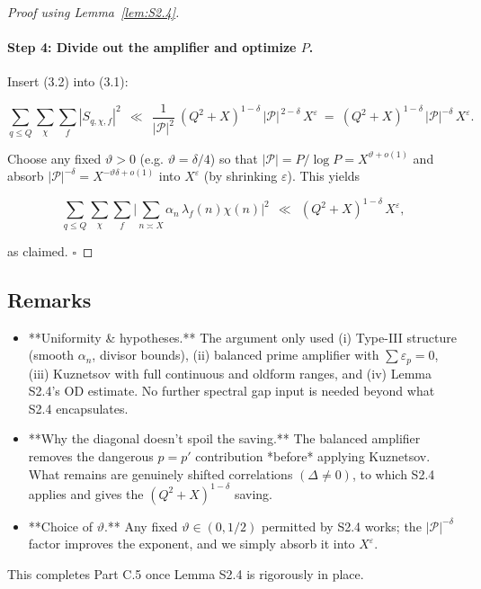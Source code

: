 \documentclass[11pt]{article}
\theoremstyle{definition}
\theoremstyle{remark}
\begin{document}
\begin{proof}[Proof using Lemma~\ref{lem:S2.4}]
\paragraph{Step 4: Divide out the amplifier and optimize $P$.}
Insert (3.2) into (3.1):

$$
\sum_{q\le Q}\sum_{\chi}\sum_f |S_{q,\chi,f}|^2
\ \ \ll\ \ \frac{1}{|\mathcal P|^2}\ (Q^2+X)^{1-\delta}\,|\mathcal P|^{\,2-\delta}\,X^{\varepsilon}
\ =\ (Q^2+X)^{1-\delta}\,|\mathcal P|^{-\delta}\,X^{\varepsilon}.
$$

Choose any fixed $\vartheta>0$ (e.g. $\vartheta=\delta/4$) so that $|\mathcal P|=P/\log P=X^{\vartheta+o(1)}$ and absorb $|\mathcal P|^{-\delta}=X^{-\vartheta\delta+o(1)}$ into $X^{\varepsilon}$ (by shrinking $\varepsilon$). This yields

$$
\sum_{q\le Q}\sum_{\chi}\sum_f \Big|\sum_{n\asymp X}\alpha_n\,\lambda_f(n)\chi(n)\Big|^2
\ \ \ll\ \ (Q^2+X)^{1-\delta}\,X^{\varepsilon},
$$

as claimed. $\square$

\end{proof}

\subsection*{Remarks}

\begin{itemize}
\item **Uniformity \& hypotheses.** The argument only used (i) Type-III structure (smooth $\alpha_n$, divisor bounds), (ii) balanced prime amplifier with $\sum \varepsilon_p=0$, (iii) Kuznetsov with full continuous and oldform ranges, and (iv) Lemma S2.4’s OD estimate. No further spectral gap input is needed beyond what S2.4 encapsulates.

\item **Why the diagonal doesn’t spoil the saving.** The balanced amplifier removes the dangerous $p=p'$ contribution *before* applying Kuznetsov. What remains are genuinely shifted correlations $(\Delta\neq 0)$, to which S2.4 applies and gives the $(Q^2+X)^{1-\delta}$ saving.

\item **Choice of $\vartheta$.** Any fixed $\vartheta\in(0,1/2)$ permitted by S2.4 works; the $|\mathcal P|^{-\delta}$ factor improves the exponent, and we simply absorb it into $X^{\varepsilon}$.
\end{itemize}

This completes Part C.5 once Lemma S2.4 is rigorously in place.
\end{document}

